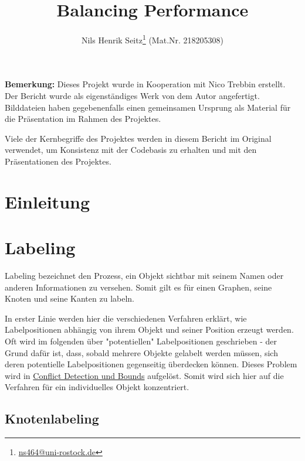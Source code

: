 \documentclass[final,nopreprintline]{elsarticle}
\begin{document}
\begin{frontmatter}

\title{Balancing Performance}
\author{Nils Henrik Seitz\footnote[1]{\href{mailto:ns464@uni-rostock.de}{ns464@uni-rostock.de}} (Mat.Nr. 218205308)}
\address{Faculty of Computer Science \\University of Rostock}


\begin{abstract}
    
\end{abstract}

\end{frontmatter}


\textbf{Bemerkung:} Dieses Projekt wurde in Kooperation mit Nico Trebbin erstellt. Der Bericht wurde als eigenständiges Werk von dem Autor angefertigt.
Bilddateien haben gegebenenfalls einen gemeinsamen Ursprung als Material für die Präsentation im Rahmen des Projektes.

Viele der Kernbegriffe des Projektes werden in diesem Bericht im Original verwendet, um Konsistenz mit der Codebasis zu erhalten und mit den Präsentationen des Projektes.

\section{Einleitung}
\label{sec:pipeline}
    


\section{Labeling}
\label{sec:labeling}
Labeling bezeichnet den Prozess, ein Objekt sichtbar mit seinem Namen oder anderen Informationen zu versehen.
Somit gilt es für einen Graphen, seine Knoten und seine Kanten zu labeln.

In erster Linie werden hier die verschiedenen Verfahren erklärt, wie Labelpositionen abhängig von ihrem Objekt und seiner Position erzeugt werden.
Oft wird im folgenden über "potentiellen" Labelpositionen geschrieben - der Grund dafür ist, dass, sobald mehrere Objekte gelabelt werden müssen, sich
deren potentielle Labelpositionen gegenseitig überdecken können. Dieses Problem wird in \hyperref[sec:conflict]{Conflict Detection und Bounds} aufgelöst.
Somit wird sich hier auf die Verfahren für ein individuelles Objekt konzentriert.
\subsection{Knotenlabeling}
\label{subsec:labeling_vertices}
    
\end{document}
